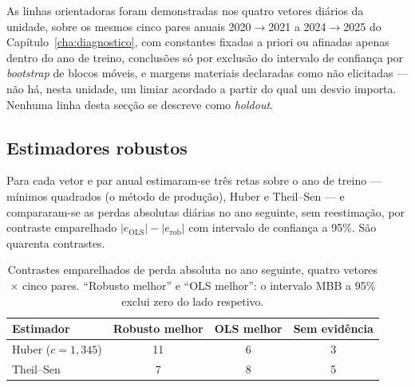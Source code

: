 As linhas orientadoras foram demonstradas nos quatro vetores diários da
unidade, sobre os mesmos cinco pares anuais 2020${\to}$2021 a
2024${\to}$2025 do Capítulo~\ref{cha:diagnostico}, com constantes fixadas a
priori ou afinadas apenas dentro do ano de treino, conclusões só por
exclusão do intervalo de confiança por \emph{bootstrap} de blocos móveis, e
margens materiais declaradas como não elicitadas --- não há, nesta unidade,
um limiar acordado a partir do qual um desvio importa. Nenhuma linha desta
secção se descreve como \emph{holdout}.

\subsection{Estimadores robustos}
\label{sec:demo-robustos}

Para cada vetor e par anual estimaram-se três retas sobre o ano de treino
--- mínimos quadrados (o método de produção), Huber e Theil--Sen --- e
compararam-se as perdas absolutas diárias no ano seguinte, sem reestimação,
por contraste emparelhado $|e_{\mathrm{OLS}}| - |e_{\mathrm{rob}}|$ com
intervalo de confiança a 95\%. São quarenta contrastes.

\begin{table}[htbp]
  \centering
  \caption[Estimadores robustos contra mínimos quadrados]{Contrastes
  emparelhados de perda absoluta no ano seguinte, quatro vetores $\times$
  cinco pares. ``Robusto melhor'' e ``OLS melhor'': o intervalo MBB a 95\%
  exclui zero do lado respetivo.}
  \label{tab:robustos}
  \begin{tabular}{lccc}
    \toprule
    Estimador & Robusto melhor & OLS melhor & Sem evidência \\
    \midrule
    Huber ($c = 1{,}345$) & 11 & 6 & 3 \\
    Theil--Sen            & 7  & 8 & 5 \\
    \bottomrule
  \end{tabular}
\end{table}

